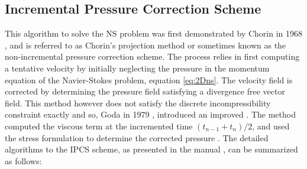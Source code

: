 

\subsection{Incremental Pressure Correction Scheme}
\label{subsec:ipcs}
This algorithm to solve the NS problem was first demonstrated by Chorin in 1968 \cite{Chorin1968}, and is referred to as Chorin's projection method or sometimes known as the non-incremental pressure correction scheme. The process relies in first computing a tentative velocity by initially neglecting the pressure in the momentum equation of the Navier-Stokes problem, equation \ref{eq:2Dns}. The velocity field is corrected by determining the pressure field satisfying a divergence free vector field. This method however does not satisfy the discrete incompressibility constraint exactly and so, Goda in 1979 \cite{Goda1979a}, introduced an improved . The method computed the viscous term at the incremented time $(t_{n-1} + t_n)/2$, and used the stress formulation to determine the corrected pressure \cite{Logg2012b}. The detailed algorithms to the IPCS scheme, as presented in the \fenics manual \cite{Logg2012b}, can be summarized as follows:


